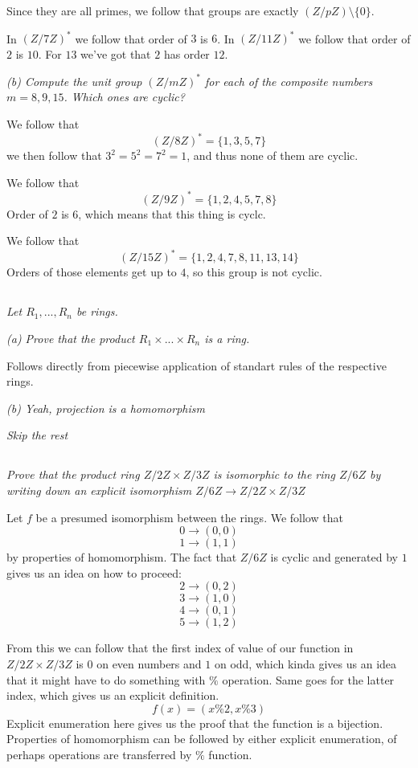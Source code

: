 \documentclass[11pt,oneside,titlepage]{book}
\newcommand{\set}[1]{\{ #1 \}}
\begin{document}
Since they are all primes, we follow that groups are exactly $(Z/pZ)
\setminus \set{0}$.

In $(Z/7Z)^*$ we follow that order of $3$ is $6$. In $(Z/11Z)^*$ we
follow that order of $2$ is $10$. For $13$ we've got that $2$ has
order $12$.

\textit{(b) Compute the unit group $(Z/mZ)^*$ for each of the
  composite numbers $m = 8, 9, 15$. Which ones are cyclic?}

We follow that
$$(Z/8Z)^* = \set{1, 3, 5, 7}$$
we then follow that $3^2 = 5^2 = 7^2 = 1$, and thus none of them are
cyclic.

We follow that
$$(Z/9Z)^* = \set{1, 2, 4, 5, 7, 8}$$
Order of $2$ is $6$, which means that this thing is cyclc.


We follow that
$$(Z/15Z)^* = \set{1, 2, 4, 7, 8, 11, 13, 14}$$
Orders of those elements get up to $4$, so this group is not cyclic.

\subsection{}

\textit{Let $R_1, ..., R_n$ be rings.}

\textit{(a) Prove that the product $R_1 \times ... \times R_n$ is a ring.}

Follows directly from piecewise application of standart rules of the
respective rings.

\textit{(b) Yeah, projection is a homomorphism}

\textit{Skip the rest}

\subsection{}

\textit{Prove that the product ring $Z/2Z \times Z/3Z$ is isomorphic
to the ring $Z/6Z$ by writing down an explicit isomorphism $Z/6Z \to
Z/2Z \times Z/3Z$}

Let $f$ be a presumed isomorphism between the rings. 
We follow that
$$0 \to (0, 0)$$
$$1 \to (1, 1)$$
by properties of homomorphism.  The fact that $Z/6Z$ is cyclic and
generated by $1$ gives us an idea on how to proceed:
$$2 \to (0, 2)$$
$$3 \to (1, 0)$$
$$4 \to (0, 1)$$
$$5 \to (1, 2)$$

From this we can follow that the first index of value of our function
in $Z/2Z \times Z/3Z$ is $0$ on even numbers and $1$ on odd, which
kinda gives us an idea that it might have to do something with $\%$
operation. Same goes for the latter index, which gives us an explicit
definition.
$$f(x) = (x \% 2, x \% 3)$$
Explicit enumeration here gives us the proof that the function is a
bijection. Properties of homomorphism can be followed by either
explicit enumeration, of perhaps operations are transferred by $\%$
function.
\end{document}
